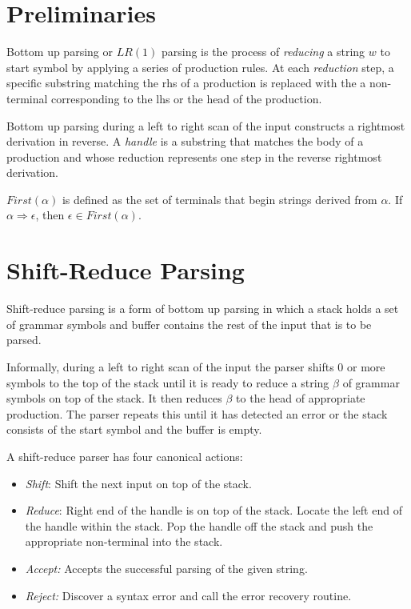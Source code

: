 \documentclass[•]{book}
\begin{document}
\section{Preliminaries}
Bottom up parsing or $LR(1)$ parsing is the process of \textit{reducing} a string $w$ to start symbol by applying a series of production rules. At each \textit{reduction} step, a specific substring matching the rhs of a production is replaced with the a non-terminal corresponding to the lhs or the head of the production.

Bottom up parsing during a left to right scan of the input constructs a rightmost derivation in reverse. A \textit{handle} is a substring that matches the body of a production and whose reduction represents one step in the reverse rightmost derivation.

$First(\alpha)$ is defined as the set of terminals that begin strings derived from $\alpha$. If $\alpha \Rightarrow \epsilon$, then $\epsilon \in First(\alpha)$.

\section{Shift-Reduce Parsing}
Shift-reduce parsing is a form of bottom up parsing in which a stack holds a set of grammar symbols and buffer contains the rest of the input that is to be parsed. 

Informally, during a left to right scan of the input the parser shifts 0 or more symbols to the top of the stack until it is ready to reduce a string $\beta$ of grammar symbols on top of the stack. It then reduces $\beta$ to the head of appropriate production. The parser repeats this until it has detected an error or the stack consists of the start symbol and the buffer is empty.

A shift-reduce parser has four canonical actions:

\begin{itemize}
\item \textit{Shift}: Shift the next input on top of the stack.
\item \textit{Reduce}: Right end of the handle is on top of the stack. Locate the left end of the handle within the stack. Pop the handle off the stack and push the appropriate non-terminal into the stack.
\item \textit{Accept:} Accepts the successful parsing of the given string.
\item \textit{Reject:} Discover a syntax error and call the error recovery routine.
\end{itemize}
\end{document}
